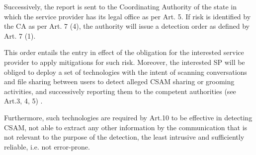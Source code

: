 Successively, the report is sent to the Coordinating Authority of the state in which the service provider has its legal office as per Art. 5. If risk is identified by the CA as per Art. 7 (4), the authority will issue a detection order as defined by Art. 7 (1). 

This order entails the entry in effect of the obligation for the interested service provider to apply mitigations for such risk. Moreover, the interested SP will be obliged to deploy a set of technologies with the intent of scanning conversations and file sharing between users to detect alleged CSAM sharing or grooming activities, and successively reporting them to the competent authorities (see Art.3, 4, 5) \cite{eu2023chatcontrol}.

Furthermore, such technologies are required by Art.10 to be effective in detecting CSAM, not able to extract any other information by the communication that is not relevant to the purpose of the detection, the least intrusive and sufficiently reliable, i.e. not error-prone.


